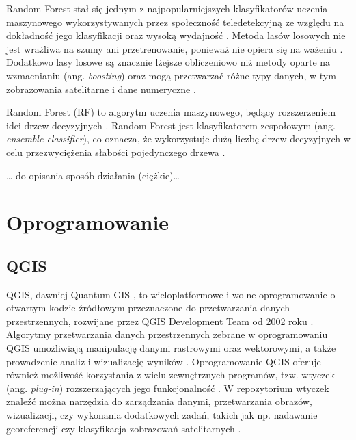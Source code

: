 \documentclass{amuthesis}
\begin{document}
Random Forest stał się jednym z najpopularniejszych klasyfikatorów
uczenia maszynowego wykorzystywanych przez społeczność teledetekcyjną ze
względu na dokładność jego klasyfikacji oraz wysoką wydajność
\autocite{belgiu_2016_rf,sheykhmousa_2020_svm_vs_rf}. Metoda lasów
losowych nie jest wrażliwa na szumy ani przetrenowanie, ponieważ nie
opiera się na ważeniu \autocite{gislason_2006_rf}. Dodatkowo lasy losowe
są znacznie lżejsze obliczeniowo niż metody oparte na wzmacnianiu (ang.
\emph{boosting}) \autocite{gislason_2006_rf} oraz mogą przetwarzać różne
typy danych, w tym zobrazowania satelitarne i dane numeryczne
\autocite{talukdar_2020_lulc}.

Random Forest (RF) to algorytm uczenia maszynowego, będący rozszerzeniem
idei drzew decyzyjnych \autocite{hejmanowska_2020_dane}. Random Forest
jest klasyfikatorem zespołowym (ang. \emph{ensemble classifier}), co
oznacza, że wykorzystuje dużą liczbę drzew decyzyjnych w celu
przezwyciężenia słabości pojedynczego drzewa \autocite{aaron_2018_ml}.

\ldots{} do opisania sposób działania (ciężkie)\ldots{}

\hypertarget{oprogramowanie}{%
\section{Oprogramowanie}\label{oprogramowanie}}

\hypertarget{qgis}{%
\subsection{QGIS}\label{qgis}}

QGIS, dawniej Quantum GIS \autocite{qgis}, to wieloplatformowe i wolne
oprogramowanie o otwartym kodzie źródłowym przeznaczone do przetwarzania
danych przestrzennych, rozwijane przez QGIS Development Team od 2002
roku \autocite{hejmanowska_2020_dane,flenniken_2020_qgis}. Algorytmy
przetwarzania danych przestrzennych zebrane w oprogramowaniu QGIS
umożliwiają manipulację danymi rastrowymi oraz wektorowymi, a także
prowadzenie analiz i wizualizację wyników
\autocite{hejmanowska_2020_dane}. Oprogramowanie QGIS oferuje również
możliwość korzystania z wielu zewnętrznych programów, tzw. wtyczek (ang.
\emph{plug-in}) rozszerzających jego funkcjonalność
\autocite{hejmanowska_2020_dane}. W repozytorium wtyczek znaleźć można
narzędzia do zarządzania danymi, przetwarzania obrazów, wizualizacji,
czy wykonania dodatkowych zadań, takich jak np. nadawanie georeferencji
czy klasyfikacja zobrazowań satelitarnych
\autocite{hejmanowska_2020_dane}.
\end{document}
